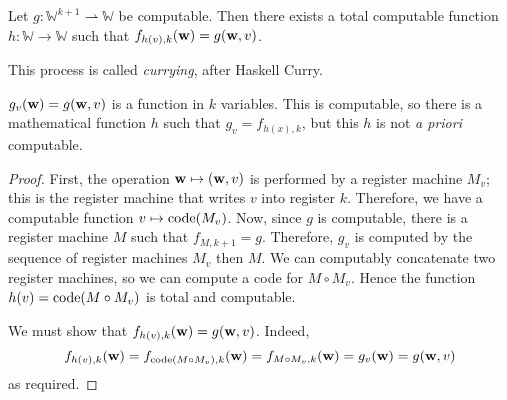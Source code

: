 \begin{theorem}
	Let \( g \colon \mathbb W^{k+1} \rightharpoonup \mathbb W \) be computable.
	Then there exists a total computable function \( h \colon \mathbb W \to \mathbb W \) such that \( f_{h(v),k}(\vb w) = g(\vb w, v) \).
\end{theorem}
This process is called \emph{currying}, after Haskell Curry.
\begin{remark}
	\( g_v(\vb w) = g(\vb w, v) \) is a function in \( k \) variables.
	This is computable, so there is a mathematical function \( h \) such that \( g_v = f_{h(x),k} \), but this \( h \) is not \emph{a priori} computable.
\end{remark}
\begin{proof}
	First, the operation \( \vb w \mapsto (\vb w, v) \) is performed by a register machine \( M_v \); this is the register machine that writes \( v \) into register \( k \).
	Therefore, we have a computable function \( v \mapsto \operatorname{code}(M_v) \).
	Now, since \( g \) is computable, there is a register machine \( M \) such that \( f_{M,k+1} = g \).
	Therefore, \( g_v \) is computed by the sequence of register machines \( M_v \) then \( M \).
	We can computably concatenate two register machines, so we can compute a code for \( M \circ M_v \).
	Hence the function \( h(v) = \operatorname{code}(M \circ M_v) \) is total and computable.

	We must show that \( f_{h(v),k}(\vb w) = g(\vb w, v) \).
	Indeed,
	\[ f_{h(v),k}(\vb w) = f_{\operatorname{code}(M \circ M_v), k}(\vb w) = f_{M \circ M_v, k}(\vb w) = g_v(\vb w) = g(\vb w, v) \]
	as required.
\end{proof}

